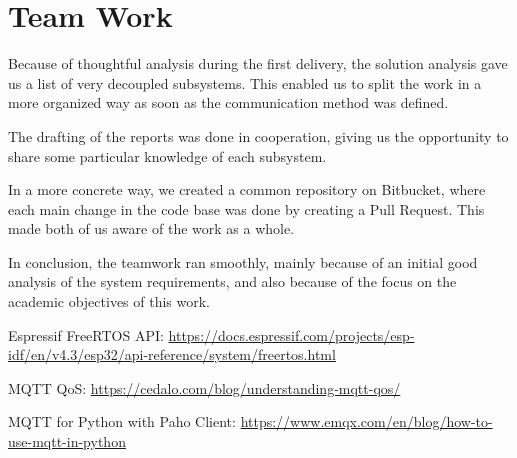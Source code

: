 \documentclass[11pt]{article}
\begin{document}
\section{Team Work}

Because of thoughtful analysis during the first delivery, the solution analysis gave us a list of very decoupled subsystems. This enabled us to split the work in a more organized way as soon as the communication method was defined.

The drafting of the reports was done in cooperation, giving us the opportunity to share some particular knowledge of each subsystem.

In a more concrete way, we created a common repository on Bitbucket, where each main change in the code base was done by creating a Pull Request. This made both of us aware of the work as a whole.

In conclusion, the teamwork ran smoothly, mainly because of an initial good analysis of the system requirements, and also because of the focus on the academic objectives of this work.

\newpage
\begin{thebibliography}{8}

 Espressif FreeRTOS API: {\url{https://docs.espressif.com/projects/esp-idf/en/v4.3/esp32/api-reference/system/freertos.html}}

MQTT QoS: {\url{https://cedalo.com/blog/understanding-mqtt-qos/}}

MQTT for Python with Paho Client: {\url{https://www.emqx.com/en/blog/how-to-use-mqtt-in-python}}

\end{thebibliography}
\end{document}
